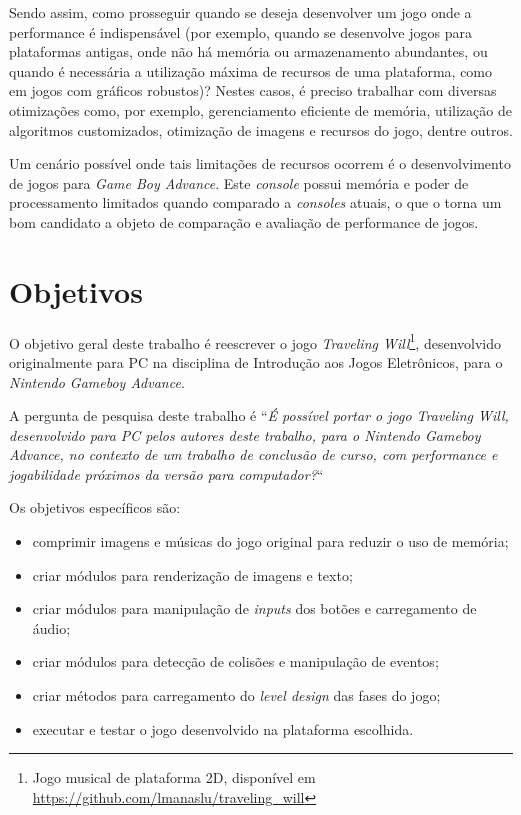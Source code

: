 Sendo assim, como prosseguir quando se deseja desenvolver um jogo onde a performance é indispensável (por exemplo, quando se desenvolve jogos para plataformas antigas, onde não há memória ou armazenamento abundantes, ou quando é necessária a utilização máxima de recursos de uma plataforma, como em jogos com gráficos robustos)? Nestes casos, é preciso trabalhar com diversas otimizações como, por exemplo, gerenciamento eficiente de memória, utilização de algoritmos customizados, otimização de imagens e recursos do jogo, dentre outros.

Um cenário possível onde tais limitações de recursos ocorrem é o desenvolvimento de jogos para \textit{Game Boy Advance}. Este \textit{console} possui memória e poder de processamento limitados quando comparado a \textit{consoles} atuais, o que o torna um bom candidato a objeto de comparação e avaliação de performance de jogos.

\section*{Objetivos}

O objetivo geral deste trabalho é reescrever o jogo \textit{Traveling Will}\footnote{Jogo musical de plataforma 2D, disponível em \url{https://github.com/lmanaslu/traveling_will}}, desenvolvido originalmente para PC na disciplina de Introdução aos Jogos Eletrônicos, para o \textit{Nintendo Gameboy Advance}.

A pergunta de pesquisa deste trabalho é ``\textit{É possível portar o jogo Traveling Will, desenvolvido para PC pelos autores deste trabalho, para o Nintendo Gameboy Advance, no contexto de um trabalho de conclusão de curso, com performance e jogabilidade próximos da versão para computador?}``

Os objetivos específicos são:

\begin{itemize}
\item comprimir imagens e músicas do jogo original para reduzir o uso de memória;
\item criar módulos para renderização de imagens e texto;
\item criar módulos para manipulação de \textit{inputs} dos botões e carregamento de áudio;
\item criar módulos para detecção de colisões e manipulação de eventos;
\item criar métodos para carregamento do \textit{level design} das fases do jogo;
\item executar e testar o jogo desenvolvido na plataforma escolhida.
\end{itemize}

